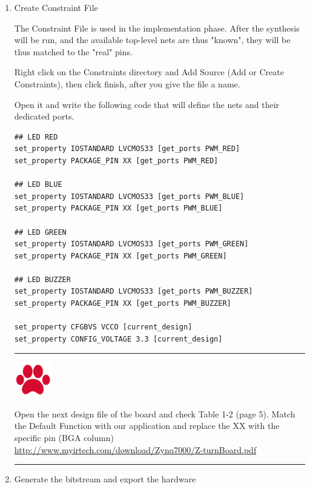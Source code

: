 \documentclass[portrait, margin=0.3in]{article}
\begin{document}
\begin{enumerate}
 \item Create Constraint File
 
The Constraint File is used in the implementation phase. After the synthesis will be run, and the available top-level nets are thus "known", they will be thus matched to the "real" pins.
  
Right click on the Constraints directory and Add Source (Add or Create Constraints), then click finish, after you give the file a name.

Open it and write the following code that will define the nets and their dedicated ports.

\begin{verbatim}
## LED RED
set_property IOSTANDARD LVCMOS33 [get_ports PWM_RED]
set_property PACKAGE_PIN XX [get_ports PWM_RED]

## LED BLUE
set_property IOSTANDARD LVCMOS33 [get_ports PWM_BLUE]
set_property PACKAGE_PIN XX [get_ports PWM_BLUE]

## LED GREEN
set_property IOSTANDARD LVCMOS33 [get_ports PWM_GREEN]
set_property PACKAGE_PIN XX [get_ports PWM_GREEN]

## LED BUZZER
set_property IOSTANDARD LVCMOS33 [get_ports PWM_BUZZER]
set_property PACKAGE_PIN XX [get_ports PWM_BUZZER]

set_property CFGBVS VCCO [current_design]
set_property CONFIG_VOLTAGE 3.3 [current_design]

\end{verbatim}

\noindent\rule{16.5cm}{1pt}

\noindent\begin{minipage}{.1\textwidth}
  \centering
  \includegraphics[height=1.5cm]{img/icon.png}
\end{minipage}
\begin{minipage}{.8\textwidth}
Open the next design file of the board and check Table 1-2 (page 5). Match the Default Function with our application and replace the XX with the specific pin (BGA column)
\url{http://www.myirtech.com/download/Zynq7000/Z-turnBoard.pdf}
\end{minipage}%

\noindent\rule{16.5cm}{1pt}


\item Generate the bitstream and export the hardware



\end{enumerate}
\end{document}
